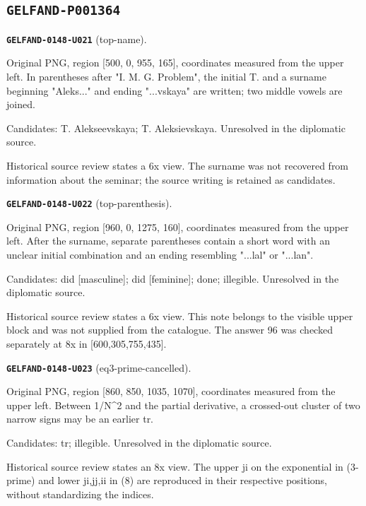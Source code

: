 \documentclass[11pt]{article}
\theoremstyle{definition}
\theoremstyle{remark}
\begin{document}
\subsection*{\texttt{GELFAND-P001364}}
\noindent\leavevmode{}\label{GELFAND-P001364:top-name:note}\textbf{\texttt{GELFAND-0148-U021}} (top-name).\par\nopagebreak[4]
Original PNG, region [500, 0, 955, 165], coordinates measured from the upper left. In parentheses after "I. M. G. Problem", the initial T. and a surname beginning "Aleks..." and ending "...vskaya" are written; two middle vowels are joined.\par
Candidates: T. Alekseevskaya; T. Aleksievskaya. Unresolved in the diplomatic source.\par
Historical source review states a 6x view. The surname was not recovered from information about the seminar; the source writing is retained as candidates.\par\medskip
\noindent\leavevmode{}\label{GELFAND-P001364:top-parenthesis:note}\textbf{\texttt{GELFAND-0148-U022}} (top-parenthesis).\par\nopagebreak[4]
Original PNG, region [960, 0, 1275, 160], coordinates measured from the upper left. After the surname, separate parentheses contain a short word with an unclear initial combination and an ending resembling "...lal" or "...lan".\par
Candidates: did [masculine]; did [feminine]; done; illegible. Unresolved in the diplomatic source.\par
Historical source review states a 6x view. This note belongs to the visible upper block and was not supplied from the catalogue. The answer 96 was checked separately at 8x in [600,305,755,435].\par\medskip
\noindent\leavevmode{}\label{GELFAND-P001364:eq3-prime-cancelled:note}\textbf{\texttt{GELFAND-0148-U023}} (eq3-prime-cancelled).\par\nopagebreak[4]
Original PNG, region [860, 850, 1035, 1070], coordinates measured from the upper left. Between 1/N\textasciicircum{}2 and the partial derivative, a crossed-out cluster of two narrow signs may be an earlier tr.\par
Candidates: tr; illegible. Unresolved in the diplomatic source.\par
Historical source review states an 8x view. The upper ji on the exponential in (3-prime) and lower ji,jj,ii in (8) are reproduced in their respective positions, without standardizing the indices.\par\medskip
\end{document}
